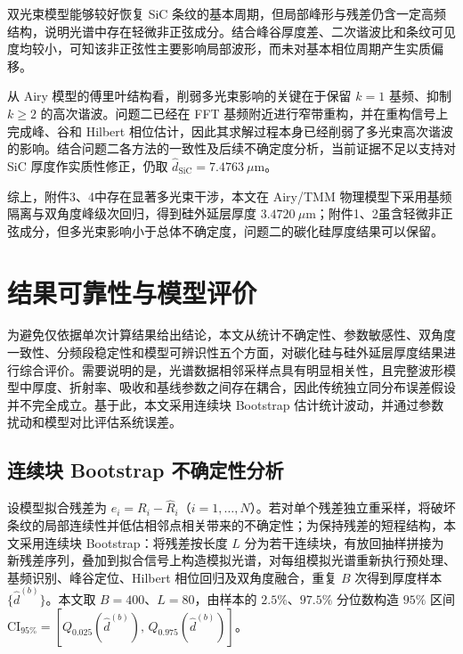 \documentclass[withoutpreface,bwprint]{cumcmthesis}
\begin{document}
双光束模型能够较好恢复 SiC 条纹的基本周期，但局部峰形与残差仍含一定高频结构，说明光谱中存在轻微非正弦成分。结合峰谷厚度差、二次谐波比和条纹可见度均较小，可知该非正弦性主要影响局部波形，而未对基本相位周期产生实质偏移。

从 Airy 模型的傅里叶结构看，削弱多光束影响的关键在于保留 $k=1$ 基频、抑制 $k\geq2$ 的高次谐波。问题二已经在 FFT 基频附近进行窄带重构，并在重构信号上完成峰、谷和 Hilbert 相位估计，因此其求解过程本身已经削弱了多光束高次谐波的影响。结合问题二各方法的一致性及后续不确定度分析，当前证据不足以支持对 SiC 厚度作实质性修正，仍取 $\widehat d_{\mathrm{SiC}}=7.4763\ \mu\mathrm m$。

综上，附件3、4中存在显著多光束干涉，本文在 Airy/TMM 物理模型下采用基频隔离与双角度峰级次回归，得到硅外延层厚度 $3.4720\ \mu\mathrm{m}$；附件1、2虽含轻微非正弦成分，但多光束影响小于总体不确定度，问题二的碳化硅厚度结果可以保留。


\section{结果可靠性与模型评价}
\label{sec:reliability}

为避免仅依据单次计算结果给出结论，本文从统计不确定性、参数敏感性、双角度一致性、分频段稳定性和模型可辨识性五个方面，对碳化硅与硅外延层厚度结果进行综合评价。需要说明的是，光谱数据相邻采样点具有明显相关性，且完整波形模型中厚度、折射率、吸收和基线参数之间存在耦合，因此传统独立同分布误差假设并不完全成立。基于此，本文采用连续块 Bootstrap 估计统计波动，并通过参数扰动和模型对比评估系统误差。

\subsection{连续块 Bootstrap 不确定性分析}
\label{subsec:block_bootstrap}

设模型拟合残差为 $e_i=R_i-\widehat R_i$（$i=1,\ldots,N$）。若对单个残差独立重采样，将破坏条纹的局部连续性并低估相邻点相关带来的不确定性；为保持残差的短程结构，本文采用连续块 Bootstrap：将残差按长度 $L$ 分为若干连续块，有放回抽样拼接为新残差序列，叠加到拟合信号上构造模拟光谱，对每组模拟光谱重新执行预处理、基频识别、峰谷定位、Hilbert 相位回归及双角度融合，重复 $B$ 次得到厚度样本 $\{\widehat d^{(b)}\}$。本文取 $B=400$、$L=80$，由样本的 $2.5\%$、$97.5\%$ 分位数构造 $95\%$ 区间 $\mathrm{CI}_{95\%}=[Q_{0.025}(\widehat d^{(b)}),\,Q_{0.975}(\widehat d^{(b)})]$。
\end{document}
